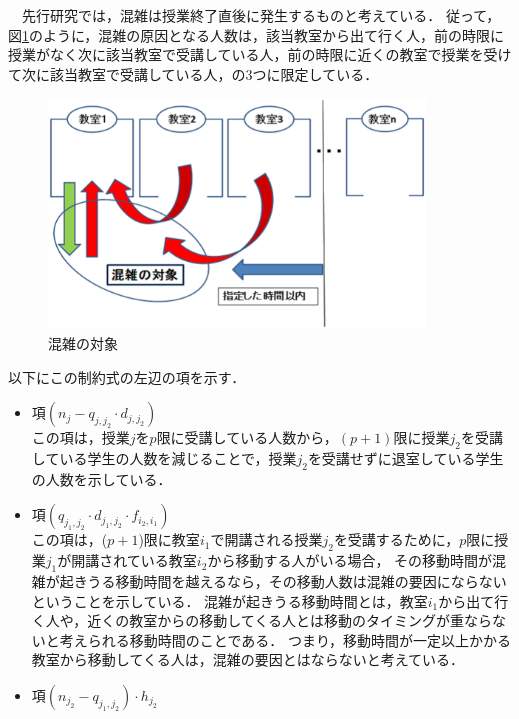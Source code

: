 \documentclass[12pt, a4paper, fleqn]{jreport}
\begin{document}
\begin{itemize}
\vspace{5.0mm}
　先行研究では，混雑は授業終了直後に発生するものと考えている．
従って，図\ref{senko-konzatu}のように，混雑の原因となる人数は，該当教室から出て行く人，前の時限に授業がなく次に該当教室で受講している人，前の時限に近くの教室で授業を受けて次に該当教室で受講している人，の3つに限定している．
\begin{figure}[h]
\begin{center}
		\includegraphics[clip,width=10cm]{senkounoito2.eps}
\caption{混雑の対象}
\label{senko-konzatu}
\end{center}	
\end{figure}


以下にこの制約式の左辺の項を示す．
\vspace{3.0mm}
\begin{itemize}
\item 項$(n_{j}-q_{j,j_2}\cdot d_{j,j_2})$\\

\vspace{-3.0mm}
この項は，授業$j$を$p$限に受講している人数から，$(p+1)$限に授業$j_2$を受講している学生の人数を減じることで，授業$j_2$を受講せずに退室している学生の人数を示している．
\vspace{3.0mm}
\item 項$(q_{j_1,j_2} \cdot d_{j_1,j_2} \cdot f_{i_2,i_1})$\\

\vspace{-3.0mm}
この項は，($p+1$)限に教室$i_1$で開講される授業$j_2$を受講するために，$p$限に授業$j_1$が開講されている教室$i_2$から移動する人がいる場合，
その移動時間が混雑が起きうる移動時間を越えるなら，その移動人数は混雑の要因にならないということを示している．
混雑が起きうる移動時間とは，教室$i_1$から出て行く人や，近くの教室からの移動してくる人とは移動のタイミングが重ならないと考えられる移動時間のことである．
つまり，移動時間が一定以上かかる教室から移動してくる人は，混雑の要因とはならないと考えている．
\vspace{3.0mm}
\item 項$ (n_{j_2} - q_{j_1,j_2}) \cdot h_{j_2}$\\


\end{itemize}
\end{itemize}
\end{document}
